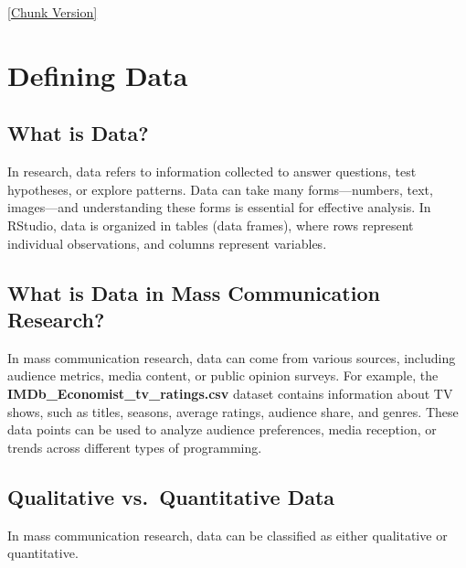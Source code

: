 \documentclass[
]{book}
\begin{document}
\href{_book/files/08-data_management-chunks.Rmd}{{[}Chunk Version{]}}

\section{Defining Data}\label{defining-data}

\subsection*{What is Data?}\label{what-is-data}

In research, data refers to information collected to answer questions, test hypotheses, or explore patterns. Data can take many forms---numbers, text, images---and understanding these forms is essential for effective analysis. In RStudio, data is organized in tables (data frames), where rows represent individual observations, and columns represent variables.

\subsection*{What is Data in Mass Communication Research?}\label{what-is-data-in-mass-communication-research}

In mass communication research, data can come from various sources, including audience metrics, media content, or public opinion surveys. For example, the \textbf{IMDb\_Economist\_tv\_ratings.csv} dataset contains information about TV shows, such as titles, seasons, average ratings, audience share, and genres. These data points can be used to analyze audience preferences, media reception, or trends across different types of programming.

\subsection*{Qualitative vs.~Quantitative Data}\label{qualitative-vs.-quantitative-data}

In mass communication research, data can be classified as either qualitative or quantitative.
\end{document}
